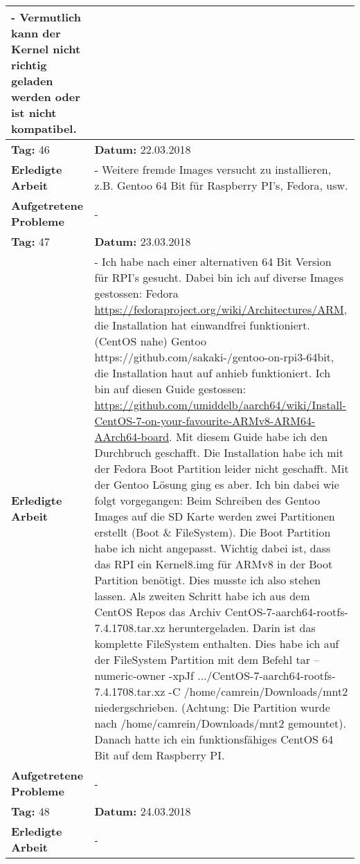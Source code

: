 \begin{longtable}{|p{5cm}|p{5cm}p{6cm}|}
{- Vermutlich kann der Kernel nicht richtig geladen werden oder ist nicht kompatibel.} \\ \hline
\rowcolor{heading}\textbf{Tag:} 46 & \textbf{Datum:} 22.03.2018 & \\ \hline
\textbf{Erledigte Arbeit} & \multicolumn{2}{p{11cm}|}{- Weitere fremde Images versucht zu installieren, z.B. Gentoo 64 Bit für Raspberry PI's, Fedora, usw.} \\ \hline
\textbf{Aufgetretene Probleme} & \multicolumn{2}{p{11cm}|}{-} \\ \hline
\rowcolor{heading}\textbf{Tag:} 47 & \textbf{Datum:} 23.03.2018 & \\ \hline
\textbf{Erledigte Arbeit} & \multicolumn{2}{p{11cm}|}{- Ich habe nach einer alternativen 64 Bit Version für RPI's gesucht. Dabei bin ich auf diverse Images gestossen: \newline Fedora \url{https://fedoraproject.org/wiki/Architectures/ARM}, die Installation hat einwandfrei funktioniert. (CentOS nahe) \newline Gentoo https://github.com/sakaki-/gentoo-on-rpi3-64bit, die Installation haut auf anhieb funktioniert. Ich bin auf diesen Guide gestossen: \url{https://github.com/umiddelb/aarch64/wiki/Install-CentOS-7-on-your-favourite-ARMv8-ARM64-AArch64-board}. Mit diesem Guide habe ich den Durchbruch geschafft. Die Installation habe ich mit der Fedora Boot Partition leider nicht geschafft. Mit der Gentoo Lösung ging es aber. Ich bin dabei wie folgt vorgegangen: Beim Schreiben des Gentoo Images auf die SD Karte werden zwei Partitionen erstellt (Boot \& FileSystem). Die Boot Partition habe ich nicht angepasst. Wichtig dabei ist, dass das RPI ein Kernel8.img für ARMv8 in der Boot Partition benötigt. Dies musste ich also stehen lassen. Als zweiten Schritt habe ich aus dem CentOS Repos das Archiv CentOS-7-aarch64-rootfs-7.4.1708.tar.xz heruntergeladen. Darin ist das komplette FileSystem enthalten. Dies habe ich auf der FileSystem Partition mit dem Befehl tar --numeric-owner -xpJf .../CentOS-7-aarch64-rootfs-7.4.1708.tar.xz -C /home/camrein/Downloads/mnt2 niedergschrieben. (Achtung: Die Partition wurde nach /home/camrein/Downloads/mnt2 gemountet). Danach hatte ich ein funktionsfähiges CentOS 64 Bit auf dem Raspberry PI.} \\ \hline
\textbf{Aufgetretene Probleme} & \multicolumn{2}{p{11cm}|}{-} \\ \hline
\rowcolor{heading}\textbf{Tag:} 48 & \textbf{Datum:} 24.03.2018 & \\ \hline
\textbf{Erledigte Arbeit} & \multicolumn{2}{p{11cm}|}{- 	
}
\end{longtable}
